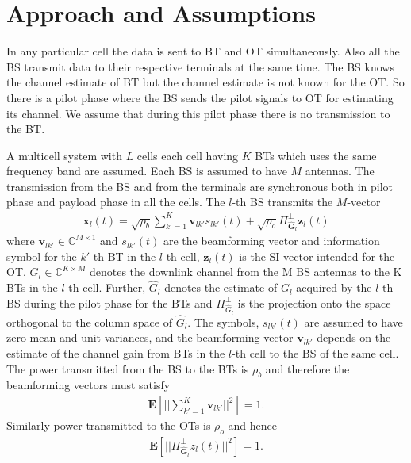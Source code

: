\documentclass[10pt, a4paper, twoside,fleqn]{article}
\begin{document}
\section{Approach and Assumptions}	
	In any particular cell the data is sent to BT and OT simultaneously. Also all the BS transmit data to their respective terminals at the same time. The BS knows the channel estimate of BT but the channel estimate is not known for the OT. So there is a pilot phase where the BS sends the pilot signals to OT for estimating its channel. We assume that during this pilot phase there is no transmission to the BT.

	A multicell system with $L$ cells each cell having $K$ BTs which uses the same frequency band are assumed. Each BS is assumed to have $M$ antennas. The transmission from the BS and from the terminals are synchronous both in pilot phase and payload phase in all the cells. The $l$-th BS transmits the $M$-vector
\begin{eqnarray}\label{eqn:txbt}
	\pmb{x}_l(t) = \sqrt{\rho_b}\sum\limits_{k'=1}^{K}\boldsymbol{v}_{lk'}s_{lk'}(t)
    		      + \sqrt{\rho_o}\Pi^{\perp}_{{\pmb{\hat{G}}_l}}\pmb{z}_l(t)
\end{eqnarray}
where $\pmb{v}_{lk'}\in\mathbb{C}^{M\times 1}$ and $s_{lk'}(t)$ are the beamforming vector and information symbol for the $k'$-th BT in the $l$-th cell, $\pmb{z}_l(t)$ is the SI vector intended for the OT. $G_l \in {\mathbb C}^{K \times M}$ denotes the downlink channel from the M BS antennas to the K BTs in the $l$-th cell. Further, ${\widehat G}_l$ denotes the estimate of $G_l$ acquired by the $l$-th BS during the pilot phase for the BTs and $\Pi^{\perp}_{{\hat{G}_l}}$ is the projection onto the space orthogonal to the column space of $\hat G_l$. The symbols, $s_{lk'}(t)$ are assumed to have zero mean and unit variances, and the beamforming vector $\pmb{v}_{lk'}$ depends on the estimate of the channel gain from BTs in the $l$-th cell to the BS of the same cell. 
The power transmitted from the BS to the BTs is $\rho_b$ and therefore the beamforming vectors must satisfy
\begin{eqnarray}\label{eqn:vkcondtion}
	\pmb{E}\left[||\sum\limits_{k'=1}^{K}\pmb{v}_{lk'}||^2\right]=1.
\end{eqnarray}
Similarly power transmitted to the OTs is $\rho_o$ and hence
\begin{eqnarray}\label{eqn:zlcondition}
	\pmb{E}\left[||\Pi^{\perp}_{\pmb{\hat{G}}_l}z_l(t)||^2\right]=1.
\end{eqnarray}
\end{document}
